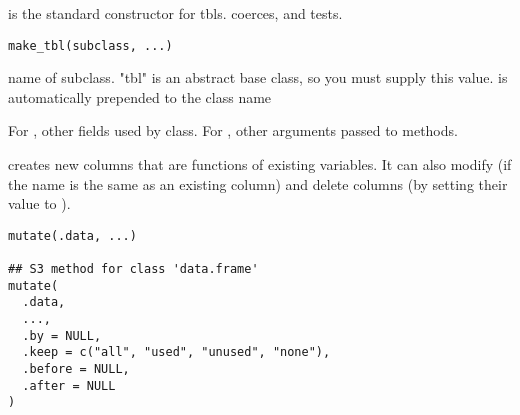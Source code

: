 \documentclass[a4paper]{book}
\begin{document}
%
\begin{Description}
 is the standard constructor for tbls.  coerces,
and  tests.
\end{Description}
%
\begin{Usage}
\begin{verbatim}
make_tbl(subclass, ...)
\end{verbatim}
\end{Usage}
%
\begin{Arguments}
\begin{ldescription}
\item[\code{subclass}] name of subclass. "tbl" is an abstract base class, so you
must supply this value.  is automatically prepended to the
class name

\item[\code{...}] For , other fields used by class. For ,
other arguments passed to methods.
\end{ldescription}
\end{Arguments}
%
\begin{Description}
 creates new columns that are functions of existing variables.
It can also modify (if the name is the same as an existing
column) and delete columns (by setting their value to ).
\end{Description}
%
\begin{Usage}
\begin{verbatim}
mutate(.data, ...)

## S3 method for class 'data.frame'
mutate(
  .data,
  ...,
  .by = NULL,
  .keep = c("all", "used", "unused", "none"),
  .before = NULL,
  .after = NULL
)
\end{verbatim}
\end{Usage}
%
\end{document}
